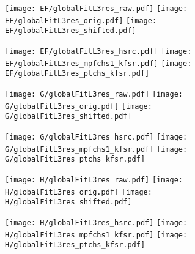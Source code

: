 \documentclass[landscape,10pt]{beamer} %
\newcommand{\commentout}[1]{}
\begin{document}
\newpage

\begin{figure}[p]
\centering
  \texttt{[image: EF/globalFitL3res\_raw.pdf]}
  \texttt{[image: EF/globalFitL3res\_orig.pdf]}
  \texttt{[image: EF/globalFitL3res\_shifted.pdf]}
\end{figure}
\begin{figure}[p]
\centering
  \texttt{[image: EF/globalFitL3res\_hsrc.pdf]}
  \texttt{[image: EF/globalFitL3res\_mpfchs1\_kfsr.pdf]}
  \texttt{[image: EF/globalFitL3res\_ptchs\_kfsr.pdf]}
\end{figure}

\newpage

\commentout{
\begin{figure}[p]
\centering
  \texttt{[image: BCDEFGH/globalFitL3res\_raw.pdf]}
  \texttt{[image: BCDEFGH/globalFitL3res\_orig.pdf]}
  \texttt{[image: BCDEFGH/globalFitL3res\_shifted.pdf]}
\end{figure}
\begin{figure}[p]
\centering
  \texttt{[image: BCDEFGH/globalFitL3res\_hsrc.pdf]}
  \texttt{[image: BCDEFGH/globalFitL3res\_mpfchs1\_kfsr.pdf]}
  \texttt{[image: BCDEFGH/globalFitL3res\_ptchs\_kfsr.pdf]}
\end{figure}

\newpage
} %

\begin{figure}[p]
\centering
  \texttt{[image: G/globalFitL3res\_raw.pdf]}
  \texttt{[image: G/globalFitL3res\_orig.pdf]}
  \texttt{[image: G/globalFitL3res\_shifted.pdf]}
\end{figure}
\begin{figure}[p]
\centering
  \texttt{[image: G/globalFitL3res\_hsrc.pdf]}
  \texttt{[image: G/globalFitL3res\_mpfchs1\_kfsr.pdf]}
  \texttt{[image: G/globalFitL3res\_ptchs\_kfsr.pdf]}
\end{figure}

\newpage

\begin{figure}[p]
\centering
  \texttt{[image: H/globalFitL3res\_raw.pdf]}
  \texttt{[image: H/globalFitL3res\_orig.pdf]}
  \texttt{[image: H/globalFitL3res\_shifted.pdf]}
\end{figure}
\begin{figure}[p]
\centering
  \texttt{[image: H/globalFitL3res\_hsrc.pdf]}
  \texttt{[image: H/globalFitL3res\_mpfchs1\_kfsr.pdf]}
  \texttt{[image: H/globalFitL3res\_ptchs\_kfsr.pdf]}
\end{figure}
\end{document}
